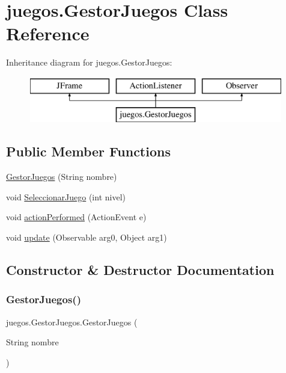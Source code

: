 \hypertarget{classjuegos_1_1_gestor_juegos}{}\section{juegos.\+Gestor\+Juegos Class Reference}
\label{classjuegos_1_1_gestor_juegos}
Inheritance diagram for juegos.\+Gestor\+Juegos\+:\begin{figure}[H]
\begin{center}
\leavevmode
\includegraphics[height=2.000000cm]{classjuegos_1_1_gestor_juegos}
\end{center}
\end{figure}
\subsection*{Public Member Functions}
\begin{DoxyCompactItemize}
\item 
\mbox{\hyperlink{classjuegos_1_1_gestor_juegos_a0992ed8b3915777539ebebb2b064aeb5}{Gestor\+Juegos}} (String nombre)
\item 
void \mbox{\hyperlink{classjuegos_1_1_gestor_juegos_a3067bb31676f6508e88fb28a6a221932}{Seleccionar\+Juego}} (int nivel)
\item 
void \mbox{\hyperlink{classjuegos_1_1_gestor_juegos_af4683ecdd836fc90d97acc35e2a61273}{action\+Performed}} (Action\+Event e)
\item 
void \mbox{\hyperlink{classjuegos_1_1_gestor_juegos_aefb5b4eb7f614e6887ddcb952a5f4af8}{update}} (Observable arg0, Object arg1)
\end{DoxyCompactItemize}


\subsection{Constructor \& Destructor Documentation}
\mbox{\label{classjuegos_1_1_gestor_juegos_a0992ed8b3915777539ebebb2b064aeb5}} 
\subsubsection{\texorpdfstring{Gestor\+Juegos()}{GestorJuegos()}}
{\footnotesize\ttfamily juegos.\+Gestor\+Juegos.\+Gestor\+Juegos (\begin{DoxyParamCaption}\item[{String}]{nombre }\end{DoxyParamCaption})}



